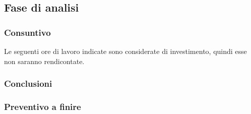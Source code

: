 \subsection{Fase di analisi}
\subsubsection{Consuntivo}

Le seguenti ore di lavoro indicate sono considerate di investimento, quindi esse non saranno rendicontate.

\subsubsection{Conclusioni}
\subsubsection{Preventivo a finire}
